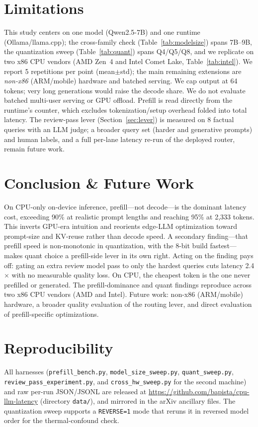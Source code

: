 \documentclass[sigconf,nonacm,10pt]{acmart}
\begin{document}
\section{Limitations}
\label{sec:limitations}
This study centers on one model (Qwen2.5-7B) and one runtime
(Ollama/llama.cpp); the cross-family check (Table~\ref{tab:modelsize}) spans
7B--9B, the quantization sweep (Table~\ref{tab:quant}) spans Q4/Q5/Q8, and we
replicate on two x86 CPU vendors (AMD Zen~4 and Intel Comet Lake,
Table~\ref{tab:intel}). We report 5 repetitions per point (mean$\pm$std); the
main remaining extensions are \emph{non-x86} (ARM/mobile) hardware and
batched serving. We cap
output at 64 tokens; very long generations would
raise the decode share. We do not evaluate batched multi-user serving or
GPU offload. Prefill is read directly from the runtime's counter, which
excludes tokenization/setup overhead folded into total latency. The
review-pass lever (Section~\ref{sec:lever}) is measured on 8 factual
queries with an LLM judge; a broader query set (harder and generative
prompts) and human labels, and a full per-lane latency re-run of the
deployed router, remain future work.

\section{Conclusion \& Future Work}
\label{sec:conclusion}
On CPU-only on-device inference, prefill---not decode---is the dominant
latency cost, exceeding 90\% at realistic prompt lengths and reaching 95\%
at 2{,}333 tokens. This inverts GPU-era intuition and reorients edge-LLM
optimization toward prompt-size and KV-reuse rather than decode speed. A
secondary finding---that prefill speed is non-monotonic in quantization,
with the 8-bit build fastest---makes quant choice a prefill-side lever in
its own right. Acting on the finding pays off: gating an extra review model
pass to only the hardest queries cuts latency 2.4$\times$ with no measurable
quality loss. On CPU, the cheapest token is the one never prefilled or
generated. The prefill-dominance and quant findings reproduce across two x86
CPU vendors (AMD and Intel). Future work: non-x86 (ARM/mobile) hardware, a
broader quality evaluation of the routing lever, and direct evaluation of
prefill-specific optimizations.

\section*{Reproducibility}
\label{sec:repro}
All harnesses (\texttt{prefill\_bench.py}, \texttt{model\_size\_sweep.py},
\texttt{quant\_sweep.py}, \texttt{review\_pass\_experiment.py}, and
\texttt{cross\_hw\_sweep.py} for the second machine) and raw per-run
JSON/JSONL are released at
\url{https://github.com/bapista/cpu-llm-latency} (directory \texttt{data/}),
and mirrored in the arXiv ancillary files. The quantization sweep supports a
\texttt{REVERSE=1} mode that reruns it in reversed model order for the
thermal-confound check.
\end{document}
